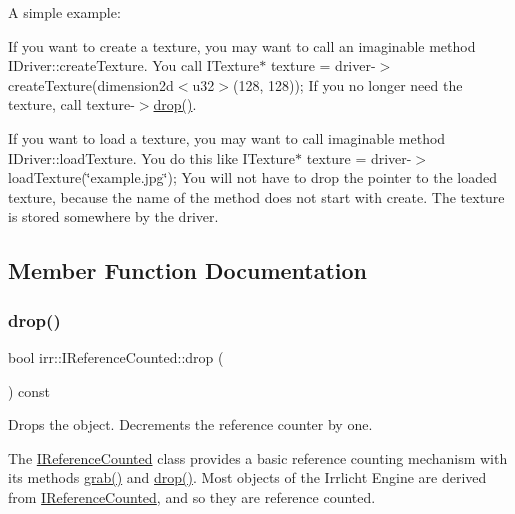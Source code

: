A simple example\+:

If you want to create a texture, you may want to call an imaginable method I\+Driver\+::create\+Texture. You call I\+Texture$\ast$ texture = driver-\/$>$create\+Texture(dimension2d$<$u32$>$(128, 128)); If you no longer need the texture, call texture-\/$>$\hyperlink{classirr_1_1IReferenceCounted_a03856a09355b89d178090c4a5f738543}{drop()}.

If you want to load a texture, you may want to call imaginable method I\+Driver\+::load\+Texture. You do this like I\+Texture$\ast$ texture = driver-\/$>$load\+Texture(\char`\"{}example.\+jpg\char`\"{}); You will not have to drop the pointer to the loaded texture, because the name of the method does not start with \textquotesingle{}create\textquotesingle{}. The texture is stored somewhere by the driver. 

\subsection{Member Function Documentation}
\mbox{\label{classirr_1_1IReferenceCounted_a03856a09355b89d178090c4a5f738543}} 
\subsubsection{\texorpdfstring{drop()}{drop()}\hspace{0.1cm}{\footnotesize\ttfamily [1/2]}}
{\footnotesize\ttfamily bool irr\+::\+I\+Reference\+Counted\+::drop (\begin{DoxyParamCaption}{ }\end{DoxyParamCaption}) const\hspace{0.3cm}{\ttfamily [inline]}}



Drops the object. Decrements the reference counter by one. 

The \hyperlink{classirr_1_1IReferenceCounted}{I\+Reference\+Counted} class provides a basic reference counting mechanism with its methods \hyperlink{classirr_1_1IReferenceCounted_a396f9cdbe311ada278626477b3c6f0f5}{grab()} and \hyperlink{classirr_1_1IReferenceCounted_a03856a09355b89d178090c4a5f738543}{drop()}. Most objects of the Irrlicht Engine are derived from \hyperlink{classirr_1_1IReferenceCounted}{I\+Reference\+Counted}, and so they are reference counted.

